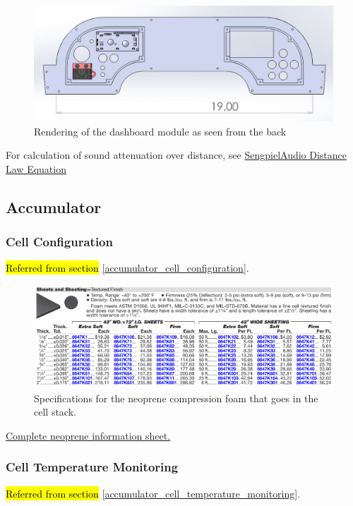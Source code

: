 \documentclass{article}
\DeclareRobustCommand{\hlr}[1]{{\sethlcolor{pink}\hl{#1}}}
\begin{document}
\begin{figure}[H]
	\includegraphics[width=\linewidth]{Dashboard_Rendering_Rear}
	\caption{Rendering of the dashboard module as seen from the back} 
    \label{fig:dashboard_Render}
\end{figure}

For calculation of sound attenuation over distance, see \href{http://www.sengpielaudio.com/calculator-distance.htm}{SengpielAudio Distance Law Equation}

\subsection{Accumulator}\label{appendix_accumulator}
\setcounter{subsubsection}{2}
\subsubsection{Cell Configuration}\label{appendix_accumulator_cell_configuration}
\hlr{Referred from section }\ref{accumulator_cell_configuration}.

\begin{figure} [H]
	\centering  %
	\includegraphics[width=\textwidth]{Cell_neoprene_stats.png}
	\caption{Specifications for the neoprene compression foam that goes in the cell stack.}	
	\label{fig:cell_neoprene_stats}
\end{figure}
\href{http://www.kvc.com.my/StorageAttachment/Kvcsb/datasheet/898/mcmaster-8694K154.pdf}{Complete neoprene information sheet.}

\subsubsection{Cell Temperature Monitoring}\label{appendix_accumulator_temperature}
\hlr{Referred from section }\ref{accumulator_cell_temperature_monitoring}.
\end{document}
